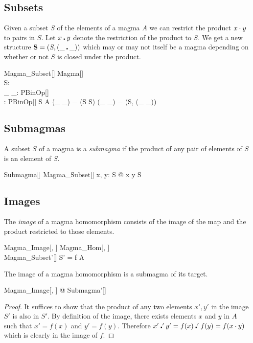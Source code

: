 \documentclass{amsart}
\begin{document}
\subsection{Subsets}

Given a subset $S$ of the elements of a magma $A$ we can
restrict the product $x \mathbin{\cdot} y$ to pairs in $S$.
Let $x \mathbin{\centerdot} y$ denote the restriction of the product to $S$.
We get a new structure $\mathbf{S} = (S, (\_ \mathbin{\centerdot} \_))$ which may or may not
itself be a magma depending on whether or not $S$ is closed under the product.

\begin{schema}{Magma\_Subset}[\genT]
	Magma[\genT] \\
	S: \power \genT \\
	\_ \opS \_: PBinOp[\genT] \\
	\strucS: \power \genT \cross PBinOp[\genT]
\where
	S \subseteq A
\also
	(\_ \opS \_) = (S \cross S) \dres (\_ \opG \_)
\also
	\strucS = (S, (\_ \opS \_))
\end{schema}

\subsection{Submagmas}

A subset $S$ of a magma is a \textit{submagma} if the product of any pair of elements of $S$ 
is an element of $S$.

\begin{schema}{Submagma}[\genT]
	Magma\_Subset[\genT]
\where
	\forall x, y: S @ x \opS y \in S
\end{schema}

\subsection{Images}

The \textit{image} of a magma homomorphism consists of the image of the map
and the product restricted to those elements.

\begin{schema}{Magma\_Image}[\genT, \genU]
	Magma\_Hom[\genT, \genU] \\
	Magma\_Subset'[\genU]
\where
	S' = f \limg A \rimg
\end{schema}

\begin{remark}
The image of a magma homomorphism is a submagma of its target.

\begin{zed}
	\forall Magma\_Image[\setT, \setU] @ Submagma'[\setU]
\end{zed}

\begin{proof}
It suffices to show that the product of any two elements $x', y'$ in the image $S'$ is 
also in $S'$. By definition of the image, there exists elements $x$ and $y$ in $A$
such that $x' = f(x)$ and $y' = f(y)$.
Therefore $x' \mathbin{\centerdot}' y' = f(x) \mathbin{\centerdot}' f(y) = f(x \mathbin{\cdot} y)$ which is clearly in the image of $f$. 
\end{proof}

\end{remark}
\end{document}
